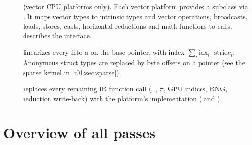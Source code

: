 \begin{description}
  \item[] (vector CPU platforms only). Each vector platform
    provides a subclass via . It maps vector types
    to intrinsic types and vector operations, broadcasts, loads, stores, casts,
    horizontal reductions and math functions to  calls.
     describes the interface.
  \item[] linearizes every  into a  on the
    base pointer, with index $\sum_i \text{idx}_i\cdot\text{stride}_i$. Anonymous struct
    types are replaced by byte offsets on a  pointer (see the sparse kernel
    in \cref{r01:sec:sparse}).
  \item[] replaces every remaining IR function call
    (, , $\pi$, GPU indices, RNG, reduction write-back) with the
    platform's implementation ( and
    ).
\end{description}

\section{Overview of all passes}


